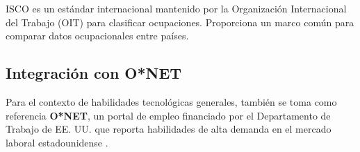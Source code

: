 ISCO es un estándar internacional mantenido por la Organización Internacional del Trabajo (OIT) para clasificar ocupaciones. Proporciona un marco común para comparar datos ocupacionales entre países.

\subsection{Integración con O*NET}

Para el contexto de habilidades tecnológicas generales, también se toma como referencia \textbf{O*NET}, un portal de empleo financiado por el Departamento de Trabajo de EE. UU. que reporta habilidades de alta demanda en el mercado laboral estadounidense \cite{rubio2024}.
